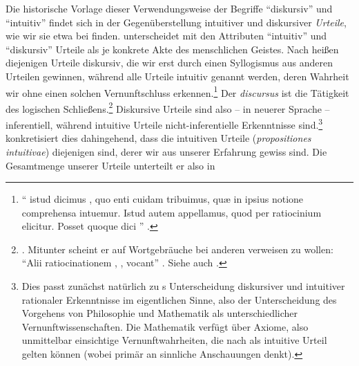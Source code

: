 \label{Abschnitt:judiciumintuitivumdiscursivum}
Die historische Vorlage dieser Verwendungsweise der Begriffe \enquote{diskursiv}
und \enquote{intuitiv} findet sich in der Gegenüberstellung intuitiver und
diskursiver \emph{Urteile}, wie wir sie etwa bei
finden. 
unterscheidet mit den Attributen \enquote{intuitiv} und \enquote{diskursiv}
Urteile als je konkrete Akte des menschlichen Geistes. Nach
heißen diejenigen Urteile
diskursiv, die wir erst durch einen Syllogismus aus anderen Urteilen gewinnen,
während alle Urteile intuitiv genannt werden, deren Wahrheit wir ohne einen solchen
Vernunftschluss erkennen.\footnote{\enquote{ istud dicimus
, quo enti cuidam tribuimus, qu{\ae} in ipsius notione
comprehensa intuemur. Istud autem  appellamus, quod
per ratiocinium {\punkt} elicitur.
Posset quoque dici }
\parencite[][\S~51]{Wolff:PhilosophiarationalissiveLogica1740}.} Der
\emph{discursus} ist die Tätigkeit des logischen
Schließens.\footnote{\cite[Vgl.][\S~52\,f.]{Wolff:PhilosophiarationalissiveLogica1740}.
Mitunter scheint er auf Wortgebräuche bei anderen verweisen zu wollen:
\enquote{Alii ratiocinationem , ,
 vocant}
\parencite[][\S~50]{Wolff:PhilosophiarationalissiveLogica1740}. Siehe auch
\cite[][\S~204]{Baumgarten:AcroasislogicainChristianumL.B.deWolff1983}.}
Diskursive Urteile sind also -- in neuerer Sprache -- inferentiell, während
intuitive Urteile nicht-inferentielle Erkenntnisse sind.\footnote{Dies passt
zunächst natürlich zu s Unterscheidung diskursiver und
intuitiver rationaler Erkenntnisse im eigentlichen Sinne, also der
Unterscheidung des Vorgehens von Philosophie und Mathematik als
unterschiedlicher Vernunftwissenschaften. Die Mathematik verfügt über Axiome,
also unmittelbar einsichtige Vernunftwahrheiten, die nach
 als intuitive
Urteil gelten können (wobei
 primär an
sinnliche Anschauungen denkt).}
 konkretisiert
dies dahingehend, dass die intuitiven Urteile (\emph{propositiones intuitivae})
diejenigen sind, derer wir aus unserer Erfahrung gewiss sind. Die
Gesamtmenge unserer Urteile unterteilt er also in
